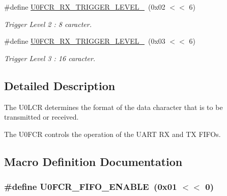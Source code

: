 \begin{DoxyCompactItemize}
\#define \hyperlink{group___l_c_r_b_i_t_s_ga662bff8ef52bde6238fc6a2d90dc387f}{U0\+F\+C\+R\+\_\+\+R\+X\+\_\+\+T\+R\+I\+G\+G\+E\+R\+\_\+\+L\+E\+V\+E\+L\+\_}~(0x02 $<$$<$ 6)
\begin{DoxyCompactList}\small\item\em Trigger Level 2 \+: 8 caracter. \end{DoxyCompactList}\item 
\#define \hyperlink{group___l_c_r_b_i_t_s_ga83db7cf080f263b776a48e29f46504d0}{U0\+F\+C\+R\+\_\+\+R\+X\+\_\+\+T\+R\+I\+G\+G\+E\+R\+\_\+\+L\+E\+V\+E\+L\+\_}~(0x03 $<$$<$ 6)
\begin{DoxyCompactList}\small\item\em Trigger Level 3 \+: 16 caracter. \end{DoxyCompactList}\end{DoxyCompactItemize}


\subsection{Detailed Description}
The U0\+L\+CR determines the format of the data character that is to be transmitted or received. 

The U0\+F\+CR controls the operation of the U\+A\+RT RX and TX F\+I\+F\+Os.

\subsection{Macro Definition Documentation}
\subsubsection[{\texorpdfstring{U0\+F\+C\+R\+\_\+\+F\+I\+F\+O\+\_\+\+E\+N\+A\+B\+LE}{U0FCR_FIFO_ENABLE}}]{\setlength{\rightskip}{0pt plus 5cm}\#define U0\+F\+C\+R\+\_\+\+F\+I\+F\+O\+\_\+\+E\+N\+A\+B\+LE~(0x01 $<$$<$ 0)}\hypertarget{group___l_c_r_b_i_t_s_ga63421105f318c07c617f31b8690d235d}{}\label{group___l_c_r_b_i_t_s_ga63421105f318c07c617f31b8690d235d}



